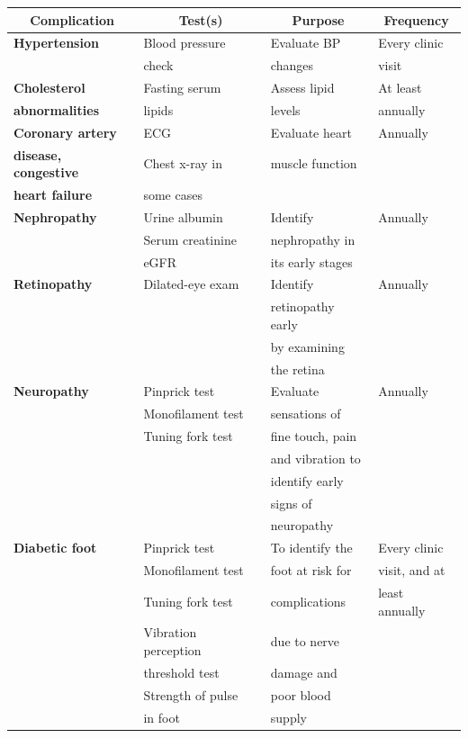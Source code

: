 {
\small\addtolength{\tabcolsep}{-5pt}
\begin{longtable}{|l|l|l|l|}
\hline
\multicolumn{1}{|c|}{\textbf{Complication}} & \multicolumn{1}{c|}{\textbf{Test(s)}} & \multicolumn{1}{c|}{\textbf{Purpose}} & \multicolumn{1}{c|}{\textbf{Frequency}}\\
\hline
\textbf{Hypertension} & Blood pressure & Evaluate BP & Every clinic\\
 & check & changes & visit\\
\hline
\textbf{Cholesterol} & Fasting serum & Assess lipid & At least\\
\textbf{abnormalities} & lipids & levels & annually\\
\hline
\textbf{Coronary artery} & ECG & Evaluate heart & Annually\\
\textbf{disease, congestive} & Chest x-ray in & muscle function & \\
\textbf{heart failure} & some cases &  & \\
\hline
\textbf{Nephropathy} & Urine albumin & Identify & Annually\\
 & Serum creatinine & nephropathy in & \\
 & eGFR & its early stages & \\
\hline
\textbf{Retinopathy} & Dilated-eye exam & Identify & Annually\\
 &  & retinopathy early & \\
 &  & by examining & \\
 &  & the retina & \\
\hline
\textbf{Neuropathy} & Pinprick test & Evaluate & Annually\\
 & Monofilament test & sensations of & \\
 & Tuning fork test & fine touch, pain & \\
 &  & and vibration to & \\
 &  & identify early & \\
 &  & signs of & \\
 &  & neuropathy & \\
\hline
\textbf{Diabetic foot} & Pinprick test & To identify the & Every clinic\\
 & Monofilament test & foot at risk for & visit, and at\\
 & Tuning fork test & complications & least annually\\
 & Vibration perception & due to nerve & \\
 & threshold test & damage and & \\
 & Strength of pulse & poor blood & \\
 & in foot & supply & \\
\hline
\end{longtable}
}\relax


